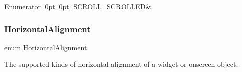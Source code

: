 \begin{DoxyEnumFields}{Enumerator}
[0pt][0pt]{}\mbox{\label{namespacesgl_a2628ea8d12e8b2563c32f05dc7fff6faaf857565304cfa8e0855f193c3ded3b04}} 
S\+C\+R\+O\+L\+L\+\_\+\+S\+C\+R\+O\+L\+L\+ED&\\
\hline

\end{DoxyEnumFields}
\mbox{\label{namespacesgl_aa00e70829e72ff16addc4d9f06fe3bc5}} 
\subsubsection{\texorpdfstring{Horizontal\+Alignment}{HorizontalAlignment}}
{\footnotesize\ttfamily enum \mbox{\hyperlink{namespacesgl_aa00e70829e72ff16addc4d9f06fe3bc5}{Horizontal\+Alignment}}}



The supported kinds of horizontal alignment of a widget or onscreen object. 

